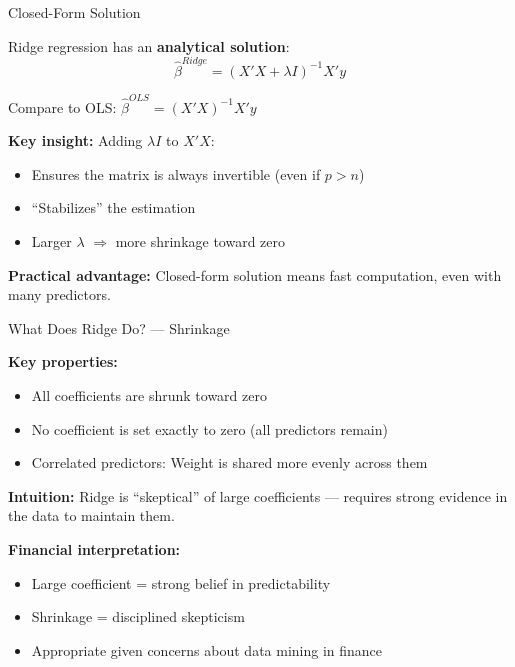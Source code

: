 \documentclass[10pt]{beamer}
\begin{document}
\begin{frame}{Closed-Form Solution}

Ridge regression has an \textbf{analytical solution}:
\[
\widehat{\beta}^{Ridge} = (X'X + \lambda I)^{-1}X'y
\]

\vspace{0.5em}
Compare to OLS: $\widehat{\beta}^{OLS} = (X'X)^{-1}X'y$

\vspace{1em}
\textbf{Key insight:} Adding $\lambda I$ to $X'X$:
\begin{itemize}
  \item Ensures the matrix is always invertible (even if $p > n$)
  \item ``Stabilizes'' the estimation
  \item Larger $\lambda$ $\Rightarrow$ more shrinkage toward zero
\end{itemize}

\vspace{1em}
\textbf{Practical advantage:} Closed-form solution means fast computation, even with many predictors.

\end{frame}


\begin{frame}{What Does Ridge Do? --- Shrinkage}

\textbf{Key properties:}
\begin{itemize}
  \item All coefficients are shrunk toward zero
  \item No coefficient is set exactly to zero (all predictors remain)
  \item Correlated predictors: Weight is shared more evenly across them
\end{itemize}

\vspace{1em}
\textbf{Intuition:} Ridge is ``skeptical'' of large coefficients --- requires strong evidence in the data to maintain them.

\vspace{1em}
\textbf{Financial interpretation:} 
\begin{itemize}
  \item Large coefficient = strong belief in predictability
  \item Shrinkage = disciplined skepticism
  \item Appropriate given concerns about data mining in finance
\end{itemize}

\end{frame}
\end{document}
